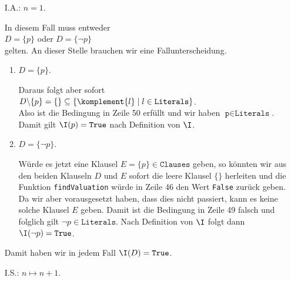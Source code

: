 \begin{enumerate}
\item[I.A.:] $n = 1$.

             In diesem Fall muss entweder
             \\[0.2cm]
             \hspace*{1.3cm}
             $D = \{ p \}$ \quad oder \quad $D = \{ \neg p \}$
             \\[0.2cm]
             gelten.  An dieser Stelle brauchen wir eine Fallunterscheidung.
             \begin{enumerate}
             \item $D = \{ p \}$.

                   Daraus folgt aber sofort
                   \\[0.2cm]
                   \hspace*{1.3cm}
                   $D \backslash \{p\} = \{\} \subseteq \{\komplement{l} \mid l \in \texttt{Literals} \}$.
                   \\[0.2cm]
                   Also ist die Bedingung in Zeile 50 erfüllt und wir haben $\texttt{p} \in
                   \texttt{Literals}$.
                   Damit gilt $\I(p) = \texttt{True}$ nach Definition von $\I$.
             \item $D = \{ \neg p \}$.

                   Würde es jetzt eine Klausel $E = \{ p\} \in \texttt{Clauses}$ geben, so könnten
                   wir aus den beiden Klauseln $D$ und $E$ sofort die leere Klausel $\{\}$
                   herleiten und die Funktion \texttt{findValuation} würde in Zeile 46 den Wert
                   \texttt{False} zurück geben.  Da wir aber vorausgesetzt haben, dass dies nicht
                   passiert, kann es keine solche Klausel $E$ geben.  Damit ist die Bedingung in
                   Zeile 49 falsch und folglich gilt $\neg p \in \texttt{Literals}$.
                   Nach Definition von $\I$ folgt dann $\I(\neg p) = \texttt{True}$.
             \end{enumerate}
             Damit haben wir in jedem Fall $\I(D) = \texttt{True}$.   
\item[I.S.:] $n \mapsto n+1$.


\end{enumerate}
